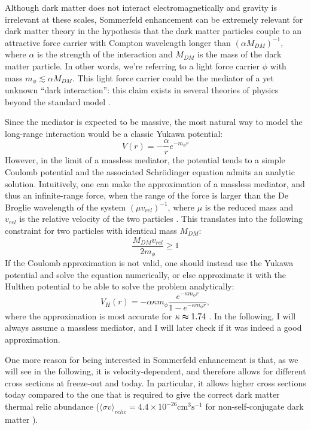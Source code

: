Although dark matter does not interact electromagnetically and gravity is irrelevant at these scales, Sommerfeld enhancement can be extremely relevant for dark matter theory in the hypothesis that the dark matter particles couple to an attractive force carrier with Compton wavelength longer than \((\alpha M_{DM})^{-1} \), where \(\alpha\) is the strength of the interaction and \(M_{DM} \) is the mass of the dark matter particle. In other words, we're referring to a light force carrier \(\phi \) with mass \(m_{\phi } \lesssim \alpha M_{DM} \). This light force carrier could be the mediator of a yet unknown ``dark interaction'': this claim exists in several theories of physics beyond the standard model \cite{Arkani_2009}.

Since the mediator is expected to be massive, the most natural way to model the long-range interaction would be a classic Yukawa potential:
\begin{equation}
	V(r) = -\frac{\alpha }{r} e^{-m_{\phi } r}
\end{equation}
However, in the limit of a massless mediator, the potential tends to a simple Coulomb potential and the associated Schrödinger equation admits an analytic solution. Intuitively, one can make the approximation of a massless mediator, and thus an infinite-range force, when the range of the force is larger than the De Broglie wavelength of the system \((\mu v_{rel})^{-1} \), where \(\mu \) is the reduced mass and \(v_{rel} \) is the relative velocity of the two particles \cite{Sala_2019}. This translates into the following constraint for two particles with identical mass \(M_{DM} \):
\begin{equation}
	\frac{M_{DM} v_{rel} }{2m_{\phi } }\geq 1
\end{equation}
If the Coulomb approximation is not valid, one should instead use the Yukawa potential and solve the equation numerically, or else approximate it with the Hulthen potential to be able to solve the problem analytically:
\begin{equation}\label{eq:Coulomb_approx}
	V_H(r) = -\alpha \kappa m_{\phi } \frac{e^{-\kappa m_{\phi }r }}{1- e^{-\kappa m_{\phi }r }},
\end{equation}
where the approximation is most accurate for \(\kappa \thickapprox 1.74\) \cite{Cirelli_2024}. In the following, I will always assume a massless mediator, and I will later check if it was indeed a good approximation.

One more reason for being interested in Sommerfeld enhancement is that, as we will see in the following, it is velocity-dependent, and therefore allows for different cross sections at freeze-out and today. In particular, it allows higher cross sections today compared to the one that is required to give the correct dark matter thermal relic abundance (\(\langle \sigma v \rangle_{relic}=4.4\times 10^{-26} \mathrm{cm^3 s^{-1}}\) for non-self-conjugate dark matter \cite{Hooper_2018}).